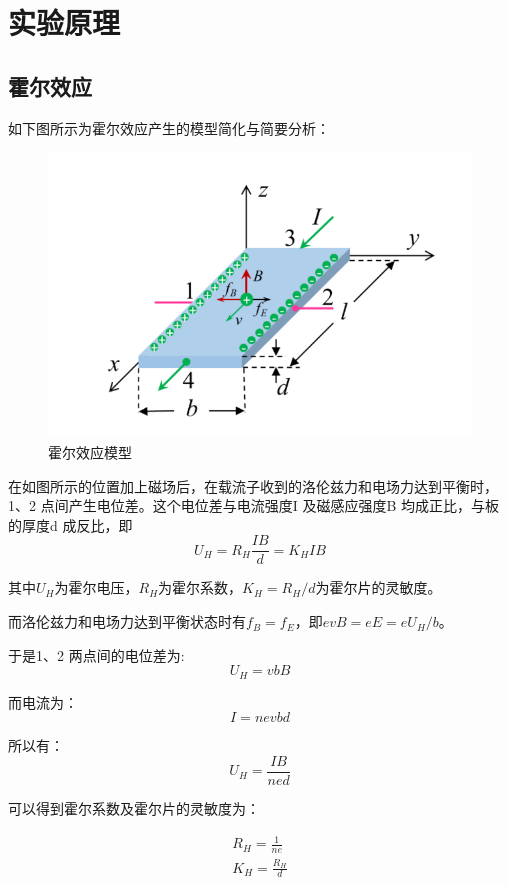 \documentclass[UTF8]{ctexart}
\begin{document}
\section{实验原理}
    \subsection {霍尔效应} 
    如下图所示为霍尔效应产生的模型简化与简要分析：

    \begin{figure}[H]
        \centering
        \includegraphics[scale=0.5]{霍尔原理.png}
        \caption{霍尔效应模型}
        \label{fig:label}
    \end{figure}
    

    在如图所示的位置加上磁场后，在载流子收到的洛伦兹力和电场力达到平衡时，1、2 点间产生电位差。这个电位差与电流强度I 及磁感应强度B 均成正比，与板的厚度d 成反比，即
    $$
    U_H = R_H\frac{IB}{d} = K_HIB
    $$

    其中$U_H$为霍尔电压，$R_H$为霍尔系数，$K_H = R_H / d$为霍尔片的灵敏度。

    而洛伦兹力和电场力达到平衡状态时有$f_B = f_E$，即$evB = eE = eU_H /b$。
    
    于是1、2 两点间的电位差为: 
    $$
    U_H = vbB \nonumber 
    $$

    而电流为：
    $$
    I = nevbd \nonumber 
    $$

    所以有：
    $$  
    U_H = \frac{IB}{ned}
    $$

    可以得到霍尔系数及霍尔片的灵敏度为：

    \begin{align}
        R_H = \frac{1}{ne} \nonumber  \\
        K_H = \frac{R_H}{d} \nonumber 
    \end{align}
\end{document}
